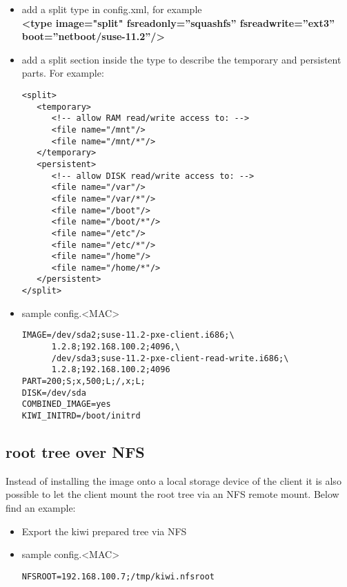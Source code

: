 \begin{itemize}
\item add a split type in config.xml, for example\\
      \textbf{<type image="split" fsreadonly=''squashfs'' fsreadwrite=''ext3''
      boot=''netboot/suse-11.2''/>}
\item add a split section inside the type to describe the temporary
      and persistent parts. For example:
\begin{verbatim}
<split>
   <temporary>
      <!-- allow RAM read/write access to: -->
      <file name="/mnt"/>
      <file name="/mnt/*"/>
   </temporary>
   <persistent>
      <!-- allow DISK read/write access to: -->
      <file name="/var"/>
      <file name="/var/*"/>
      <file name="/boot"/>
      <file name="/boot/*"/>
      <file name="/etc"/>
      <file name="/etc/*"/>
      <file name="/home"/>
      <file name="/home/*"/>
   </persistent>
</split>
\end{verbatim}
\item sample config.<MAC>
     
\begin{Command}{14cm}
\begin{verbatim}
IMAGE=/dev/sda2;suse-11.2-pxe-client.i686;\
      1.2.8;192.168.100.2;4096,\
      /dev/sda3;suse-11.2-pxe-client-read-write.i686;\
      1.2.8;192.168.100.2;4096
PART=200;S;x,500;L;/,x;L;
DISK=/dev/sda
COMBINED_IMAGE=yes
KIWI_INITRD=/boot/initrd
\end{verbatim}
\end{Command}
\end{itemize}

\subsection{root tree over NFS}

Instead of installing the image onto a local storage device of
the client it is also possible to let the client mount the root
tree via an NFS remote mount. Below find an example:

\begin{itemize}
\item Export the kiwi prepared tree via NFS
\item sample config.<MAC>

\begin{Command}{12cm}
\begin{verbatim}
NFSROOT=192.168.100.7;/tmp/kiwi.nfsroot
\end{verbatim}
\end{Command}
\end{itemize}

